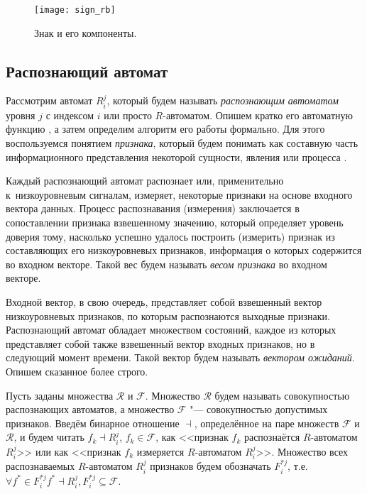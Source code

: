 \begin{figure}[h]
	\centering
    \texttt{[image: sign\_rb]}
    \caption{Знак и его компоненты.}
    \label{fg:sign_rb}
\end{figure}

\subsection{Распознающий автомат} \label{sect:recogn_block}
Рассмотрим автомат $R_i^j$, который будем называть \textit{распознающим автоматом} уровня $j$ с индексом $i$ или просто $R$-автоматом. Опишем кратко его автоматную функцию \cite{Kudryavtcev1985}, а затем определим алгоритм его работы формально.  Для этого воспользуемся понятием \textit{признака}, который будем понимать как составную часть информационного представления некоторой сущности, явления или процесса \cite{Vapnik1974}.

Каждый распознающий автомат распознает или, применительно к~низкоуровневым сигналам, измеряет, некоторые признаки на основе входного вектора данных.  Процесс распознавания (измерения) заключается в сопоставлении признака взвешенному значению, который определяет уровень доверия тому, насколько успешно удалось построить (измерить) признак из составляющих его низкоуровневых признаков, информация о которых содержится во входном векторе. Такой вес будем называть \textit{весом признака} во входном векторе.

Входной вектор, в свою очередь, представляет собой взвешенный вектор низкоуровневых признаков, по которым распознаются выходные признаки. Распознающий автомат обладает множеством состояний, каждое из которых представляет собой также взвешенный вектор входных признаков, но в следующий момент времени. Такой вектор будем называть \textit{вектором ожиданий}. Опишем сказанное более строго.

Пусть заданы множества $\mathcal R$ и $\mathcal F$. Множество $\mathcal R$ будем называть совокупностью распознающих автоматов, а множество $\mathcal F$ "--- совокупностью допустимых признаков. Введём бинарное отношение $\dashv$, определённое на паре множеств $\mathcal F$ и $\mathcal R$, и будем читать $f_k{\dashv}R_i^j$, $f_k\in\mathcal F$, как <<признак $f_k$ распознаётся $R$-автоматом $R_i^j$>> или как <<признак $f_k$ измеряется $R$-автоматом $R_i^j$>>. Множество всех распознаваемых $R$-автоматом $R_i^j$ признаков будем обозначать $F_i^{*j}$, т.е. ${\forall}f^*{\in}F_i^{*j} f^*{\dashv}R_i^j, F_i^{*j}{\subseteq}\mathcal F$.

